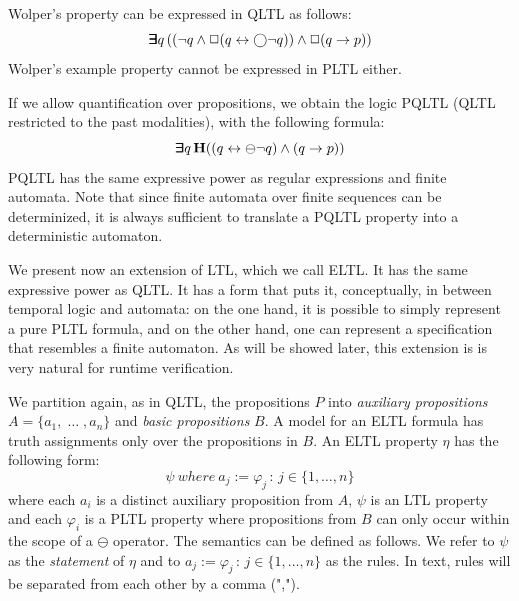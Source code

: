 \noindent
Wolper's property can be expressed in QLTL as follows:
\begin{equation} \label{form0} \bm{\exists}\kern-0.6em\bm{\exists} q \,
( (  \neg q \wedge \Box (q \leftrightarrow \bigcirc \neg q )  )  \wedge \Box (q \rightarrow p ) )\end{equation}
Wolper's example property cannot be expressed in PLTL either.

If we allow
quantification over propositions, we obtain the logic PQLTL
(QLTL restricted to the past modalities), with the following formula:
\begin{equation} \label{form1} \bm{\exists}\kern-0.6em\bm{\exists} q \,
{\bf H} (( q \leftrightarrow \ominus \neg q )   \wedge (q \rightarrow p ) )\end{equation}
PQLTL has the same expressive
power as regular expressions and finite automata.
Note that since finite automata over finite sequences can be determinized, it is always sufficient to translate a
PQLTL property into a deterministic
automaton.




We present now an extension of LTL, which we call ELTL. It has the same
expressive power as  QLTL.
It has a form that puts it, conceptually, in between temporal
logic and automata: on the one hand, it is possible to simply represent
a pure PLTL formula, and on the other hand, one can represent a specification that resembles a finite automaton. As will be showed later, this extension is
is very natural for runtime verification.

We partition again, as in QLTL, the propositions $P$ into
{\em auxiliary propositions} $A = \{ a_1 , \; \ldots\; , a_n \}$
and {\em basic propositions} $B$. A model for an ELTL formula has truth assignments only over the propositions in $B$.
An ELTL property $\eta$ has the following form: 
\begin{equation} \label{ELTL}
\psi \mathit{\ where\ } a_j  := \varphi_j \, : \, 
 {j \in \{1, \ldots , n\}} \end{equation}
where each $a_i$ is a distinct auxiliary proposition from $A$,
$\psi$ is an LTL property and each $\varphi_i$ 
is a PLTL property where propositions from $B$ can
only occur within the scope of a $\ominus$ operator.
The semantics can be defined as follows. We refer to $\psi$
as the {\em statement} of $\eta$ and to 
$a_j  := \varphi_j \, : \, 
 {j \in \{1, \ldots , n\}}$ as the rules. In text, rules
 will be separated from each other by a comma (",").

